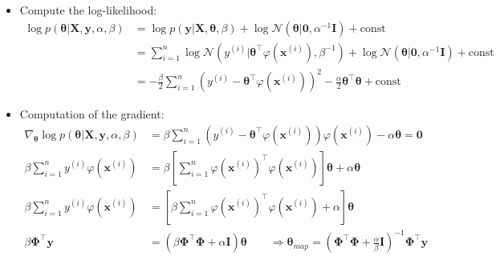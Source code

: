\begin{frame}
	\begin{itemize}
		\item Compute the log-likelihood:
		\begin{align}
			\log p(\bm{\theta} \vert \bm{X}, \bm{y}, \alpha, \beta)
				&= \log p(\bm{y} \vert \bm{X}, \bm{\theta}, \beta) + \log \mathcal{N}(\bm{\theta} \vert \bm{0}, \alpha^{-1} \bm{I}) + \text{const} \\
				&= \sum_{i=1}^n \log \mathcal{N}(y^{(i)} \vert \bm{\theta}^{\intercal} \varphi(\bm{x}^{(i)}), \beta^{-1}) +
					\log \mathcal{N}(\bm{\theta} \vert \bm{0}, \alpha^{-1} \bm{I}) + \text{const} \\
				&= -\frac{\beta}{2} \sum_{i=1}^n (y^{(i)} - \bm{\theta}^{\intercal} \varphi(\bm{x}^{(i)}))^2 - \frac{\alpha}{2}\bm{\theta}^{\intercal} \bm{\theta} + \text{const}
		\end{align}
		\item Computation of the gradient:
		\begin{align}
			\nabla_{\bm{\theta}} \log p(\bm{\theta} \vert \bm{X}, \bm{y}, \alpha, \beta)
				&= \beta \sum_{i=1}^n (y^{(i)} - \bm{\theta}^{\intercal} \varphi(\bm{x}^{(i)})) \varphi(\bm{x}^{(i)}) - \alpha \bm{\theta} = \bm{0} \\
			\beta \sum_{i=1}^n y^{(i)} \varphi(\bm{x}^{(i)})
				&= \beta \left[ \sum_{i=1}^n \varphi(\bm{x}^{(i)})^{\intercal} \varphi(\bm{x}^{(i)}) \right] \bm{\theta} + \alpha \bm{\theta} \\
			\beta \sum_{i=1}^n y^{(i)} \varphi(\bm{x}^{(i)})
				&= \left[ \beta \sum_{i=1}^n \varphi(\bm{x}^{(i)})^{\intercal} \varphi(\bm{x}^{(i)}) + \alpha \right] \bm{\theta} \\
			\beta \bm{\Phi}^{\intercal} \bm{y}
				&= (\beta \bm{\Phi}^{\intercal} \bm{\Phi} + \alpha \bm{I}) \bm{\theta} \qquad \Rightarrow
					\bm{\theta}_{map} = \left( \bm{\Phi}^{\intercal} \bm{\Phi} + \frac{\alpha}{\beta} \bm{I} \right)^{-1} \bm{\Phi}^{\intercal} \bm{y}
		\end{align}
	\end{itemize}
\end{frame}


